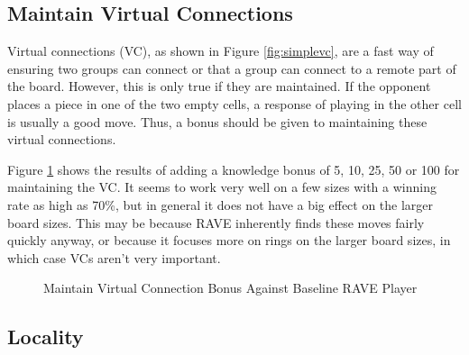\subsection{Maintain Virtual Connections}

Virtual connections (VC), as shown in Figure \ref{fig:simplevc}, are a fast way of ensuring two groups can connect or that a group can connect to a remote part of the board. However, this is only true if they are maintained. If the opponent places a piece in one of the two empty cells, a response of playing in the other cell is usually a good move. Thus, a bonus should be given to maintaining these virtual connections.

Figure \ref{fig:maintainvc} shows the results of adding a knowledge bonus of 5, 10, 25, 50 or 100 for maintaining the VC. It seems to work very well on a few sizes with a winning rate as high as 70\%, but in general it does not have a big effect on the larger board sizes. This may be because RAVE inherently finds these moves fairly quickly anyway, or because it focuses more on rings on the larger board sizes, in which case VCs aren't very important.

\begin{figure}
	\centering
{}
	\caption[Maintain Virtual Connection Bonus]{Maintain Virtual Connection Bonus Against Baseline RAVE Player}
	\label{fig:maintainvc}
\end{figure}



\subsection{Locality}


